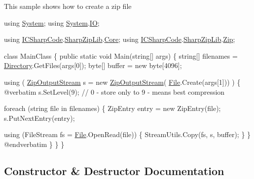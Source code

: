 This sample shows how to create a zip file 
\begin{DoxyCode}
\textcolor{keyword}{using} \hyperlink{namespace_system}{System};
\textcolor{keyword}{using} \hyperlink{namespace_system}{System}.\hyperlink{namespace_system_1_1_i_o}{IO};

\textcolor{keyword}{using} \hyperlink{namespace_i_c_sharp_code}{ICSharpCode}.\hyperlink{namespace_i_c_sharp_code_1_1_sharp_zip_lib}{SharpZipLib}.\hyperlink{namespace_i_c_sharp_code_1_1_sharp_zip_lib_1_1_core}{Core};
\textcolor{keyword}{using} \hyperlink{namespace_i_c_sharp_code}{ICSharpCode}.\hyperlink{namespace_i_c_sharp_code_1_1_sharp_zip_lib}{SharpZipLib}.\hyperlink{namespace_i_c_sharp_code_1_1_sharp_zip_lib_1_1_zip}{Zip};

\textcolor{keyword}{class }MainClass
\{
    \textcolor{keyword}{public} \textcolor{keyword}{static} \textcolor{keywordtype}{void} Main(\textcolor{keywordtype}{string}[] args)
    \{
        \textcolor{keywordtype}{string}[] filenames = \hyperlink{namespace_lerp2_a_p_i_1_1_utility_af5d628470963cc0f18c37055b4170bf1ae73cda510e8bb947f7e61089e5581494}{Directory}.GetFiles(args[0]);
        byte[] buffer = \textcolor{keyword}{new} byte[4096];

        \textcolor{keyword}{using} ( \hyperlink{class_i_c_sharp_code_1_1_sharp_zip_lib_1_1_zip_1_1_zip_output_stream_a19fba03baf9f8523b17358da692fe8a6}{ZipOutputStream} s = \textcolor{keyword}{new} \hyperlink{class_i_c_sharp_code_1_1_sharp_zip_lib_1_1_zip_1_1_zip_output_stream_a19fba03baf9f8523b17358da692fe8a6}{ZipOutputStream}(
      \hyperlink{namespace_lerp2_a_p_i_1_1_utility_af5d628470963cc0f18c37055b4170bf1a0b27918290ff5323bea1e3b78a9cf04e}{File}.Create(args[1])) ) \{
@verbatim
s.SetLevel(9); \textcolor{comment}{// 0 - store only to 9 - means best compression}

\textcolor{keywordflow}{foreach} (\textcolor{keywordtype}{string} file \textcolor{keywordflow}{in} filenames) \{
    ZipEntry entry = \textcolor{keyword}{new} ZipEntry(file);
    s.PutNextEntry(entry);

    \textcolor{keyword}{using} (FileStream fs = \hyperlink{namespace_lerp2_a_p_i_1_1_utility_af5d628470963cc0f18c37055b4170bf1a0b27918290ff5323bea1e3b78a9cf04e}{File}.OpenRead(file)) \{
        StreamUtils.Copy(fs, s, buffer);
    \}
\}
\textcolor{keyword}{@end}verbatim
        \}
    \}
\}   
\end{DoxyCode}
 

\subsection{Constructor \& Destructor Documentation}
\mbox{\label{class_i_c_sharp_code_1_1_sharp_zip_lib_1_1_zip_1_1_zip_output_stream_a19fba03baf9f8523b17358da692fe8a6}} 
